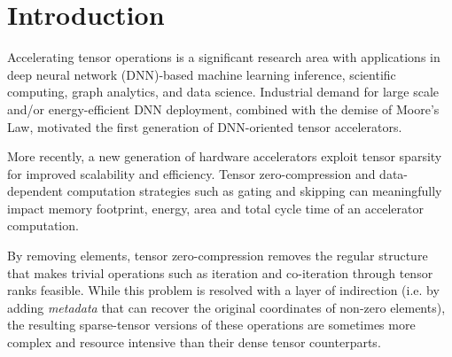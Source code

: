 \chapter{Introduction}
\label{chapter:introduction}

Accelerating tensor operations is a significant research area with applications in deep neural network (DNN)-based machine learning inference\cite{eyeriss}\cite{eyerissv2}\cite{tpu}\cite{extensor}, scientific computing\cite{sci_tensor}, graph analytics\cite{mattson2013standards}, and data science\cite{mcauley2013hidden}\cite{kolda2009tensor}\cite{bader2008discussion}. Industrial demand for large scale\cite{tpu} and/or energy-efficient\cite{eyeriss} DNN deployment, combined with the demise of Moore's Law\cite{moore}, motivated the first generation of DNN-oriented tensor accelerators\cite{eyeriss}\cite{tpu}.

More recently, a new generation of hardware accelerators exploit tensor sparsity for improved scalability and efficiency\cite{ampere}\cite{eyerissv2}\cite{sparten}\cite{sparch}\cite{scnn}\cite{candles}\cite{extensor}. Tensor zero-compression \cite{szebook} \cite{sparseloop} \cite{extensor} and data-dependent computation strategies such as gating and skipping \cite{szebook} \cite{sparseloop} can meaningfully impact memory footprint, energy, area and total cycle time of an accelerator computation\cite{szebook}\cite{sparseloop}.

By removing elements, tensor zero-compression removes the regular structure that makes trivial operations such as iteration and co-iteration through tensor ranks feasible. While this problem is resolved with a layer of indirection (i.e. by adding \textit{metadata} that can recover the original coordinates of non-zero elements\cite{szebook}), the resulting sparse-tensor versions of these operations are sometimes more complex and resource intensive than their dense tensor counterparts\cite{extensor}\cite{sparten}\cite{sparch}\cite{ampere}. 

